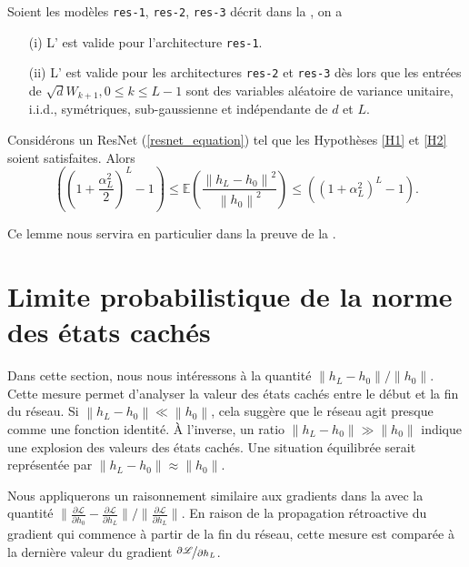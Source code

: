 \begin{proposition}[Admis]\label{prop1}
    Soient les modèles \texttt{res-1}, \texttt{res-2}, \texttt{res-3} décrit dans la , on a \begin{itemize}
        \item [(i)] L' est valide pour l'architecture \texttt{res-1}.
        \item [(ii)] L' est valide pour les architectures \texttt{res-2} et \texttt{res-3} dès lors que les entrées de $ \sqrt{d}W_{k+1}, 0 \leqslant k \leqslant L-1 $ sont des variables aléatoire de variance unitaire, i.i.d., symétriques, sub-gaussienne et indépendante de $ d $ et $ L $.
    \end{itemize}
\end{proposition}

\begin{lem}[Admis]\label{lem14}
    Considérons un ResNet (\ref{resnet_equation}) tel que les Hypothèses \ref{H1} et \ref{H2} soient satisfaites. Alors
    \[
        ((1 + \frac{\alpha _L ^2 }{2 }) ^L - 1) \leqslant \mathbb{E}( \frac{\left\| h_L - h_0 \right\| ^2 }{\left\| h_0 \right\| ^2}) \leqslant ((1 + \alpha _L ^2 ) ^L - 1 )
    .\]
\end{lem}
Ce lemme nous servira en particulier dans la preuve de la .

\section{Limite probabilistique de la norme des états cachés}

Dans cette section, nous nous intéressons à la quantité $ {\left\| h_L - h_0 \right\|} / {\left\| h_0 \right\|}$. Cette mesure permet d'analyser la valeur des états cachés entre le début et la fin du réseau. Si $\left\| h_L - h_0 \right\| \ll \left\| h_0 \right\|$, cela suggère que le réseau agit presque comme une fonction identité. À l'inverse, un ratio $\left\| h_L - h_0 \right\| \gg \left\| h_0 \right\|$ indique une explosion des valeurs des états cachés. Une situation équilibrée serait représentée par $\left\| h_L - h_0 \right\| \approx \left\| h_0 \right\|$.

Nous appliquerons un raisonnement similaire aux gradients dans la  avec la quantité ${\| \frac{\partial \mathscr{L}}{\partial h_0} - \frac{\partial \mathscr{L}}{\partial h_L} \|} / {\| \frac{\partial \mathscr{L}}{\partial h_L} \|}$. En raison de la propagation rétroactive du gradient qui commence à partir de la fin du réseau, cette mesure est comparée à la dernière valeur du gradient $\nicefrac{\partial \mathscr{L}}{\partial h_L}$.

